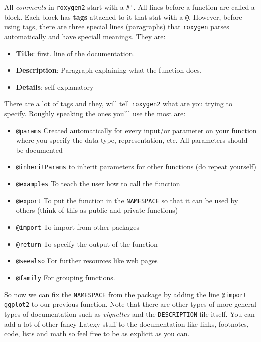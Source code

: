 \documentclass[pdftex,11pt,a4paper]{article}
\begin{document}
All \textit{comments} in \verb|roxygen2| start with a \verb|#'|. All lines before a function are called a block. Each block has \textbf{tags} attached to it that stat with a \verb|@|. However, before using tags, there are three special lines (paragraphs) that \verb|roxygen| parses automatically and have speciall meanings. They are: 

\begin{itemize}
	\item \textbf{Title}: first. line of the documentation. 
	\item \textbf{Description}: Paragraph explaining what the function does.
	\item \textbf{Details}: self explanatory
\end{itemize}

There are a lot of tags and they, will tell \verb|roxygen2| what are you trying to specify. Roughly speaking the ones you'll use the most are:

\begin{itemize}
	\item \verb|@params| Created automatically for every input/or parameter on your function  where you specify the data type, representation, etc. All parameters should be documented
	\item	\verb|@inheritParams| to inherit parameters for other functions (do repeat yourself)
	\item \verb|@examples| To teach the user how to call the function
	\item \verb|@export| To put the function in the \verb|NAMESPACE| so that it can be used by others (think of this as public and private functions)
	\item \verb|@import| To import from other packages
	\item \verb|@return| To specify the output of the function
	\item \verb|@seealso| For further resources like web pages
	\item \verb|@family| For grouping functions. 
\end{itemize}

So now we can fix the \verb|NAMESPACE| from the package by adding the line \verb|@import ggplot2| to our previous function. Note that there are other types of more general types of documentation such as \textit{vignettes} and the \verb|DESCRIPTION| file itself. You can add a lot of other fancy Latexy stuff to the documentation like links, footnotes, code, lists and math so feel free to be as explicit as you can.  
\end{document}

